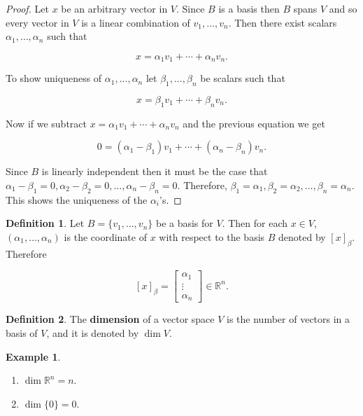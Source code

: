 \documentclass[12pt]{article}
\theoremstyle{definition}
\newtheorem*{definition}{Definition}
\newtheorem*{example}{Example}
\begin{document}
\begin{proof}
Let $x$ be an arbitrary vector in $V$. Since $B$ is a basis then $B$ spans $V$ and so
every vector in $V$ is a linear combination of $v_1, \ldots, v_n$. Then there exist
scalars $\alpha_1, \ldots, \alpha_n$ such that

\[ x = \alpha_1 v_1 + \cdots + \alpha_n v_n. \]

To show uniqueness of $\alpha_1, \ldots, \alpha_n$ let $\beta_1, \dots, \beta_n$ be scalars
such that

\[ x = \beta_1 v_1 + \cdots + \beta_n v_n. \]

Now if we subtract $x = \alpha_1 v_1 + \cdots + \alpha_n v_n$ and the previous equation we
get

\[ 0 = (\alpha_1 - \beta_1) v_1 + \cdots + (\alpha_n - \beta_n) v_n. \]

Since $B$ is linearly independent then it must be the case that
$\alpha_1 - \beta_1 = 0, \alpha_2 - \beta_2 = 0, \ldots, \alpha_n - \beta_n = 0$. Therefore,
$\beta_1 = \alpha_1, \beta_2 = \alpha_2, \ldots, \beta_n = \alpha_n$. This shows the 
uniqueness of the $\alpha_i$'s. 
\end{proof}


\begin{definition}
Let $B = \{v_1, \ldots, v_n \}$ be a basis for $V$. Then for each $x \in V$, $(\alpha_1, \dots, \alpha_n)$
is the coordinate of $x$ with respect to the basis $B$ denoted by $[x]_{\beta}$. Therefore

\[ [x]_{\beta} = \begin{bmatrix} \alpha_1 \\ \vdots \\ \alpha_n \end{bmatrix} \in \mathbb{R}^n. \]
\end{definition}

\begin{definition}
The \textbf{dimension} of a vector space $V$ is the number of vectors in a basis of $V$,
and it is denoted by $\dim V$.
\end{definition}

\begin{example}
\begin{enumerate}[label = (\arabic*)]
\item $\dim \mathbb{R}^n = n$.
\item $\dim \{ 0 \} = 0$.
\end{enumerate}
\end{example}
\end{document}
